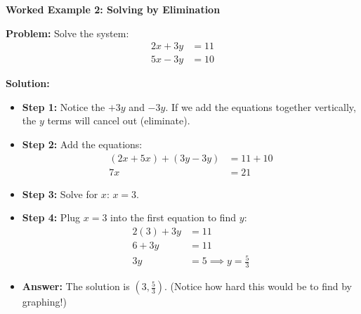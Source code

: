 \documentclass[12pt, letterpaper, fleqn]{article}
\begin{document}
\begin{tcolorbox}[colback=white, colframe=black!25, boxrule=0.6pt, arc=4mm, left=6mm, right=6mm, top=5mm, bottom=5mm]

\textbf{Worked Example 2: Solving by Elimination}

\medskip

\textbf{Problem:} Solve the system:
\begin{align*}
    2x + 3y &= 11 \\
    5x - 3y &= 10
\end{align*}

\medskip

\textbf{Solution:}
\begin{itemize}
    \item \textbf{Step 1:} Notice the $+3y$ and $-3y$. If we add the equations together vertically, the $y$ terms will cancel out (eliminate).
    \item \textbf{Step 2:} Add the equations:
    \begin{align*}
        (2x + 5x) + (3y - 3y) &= 11 + 10 \\
        7x &= 21
    \end{align*}
    \item \textbf{Step 3:} Solve for $x$: $x = 3$.
    \item \textbf{Step 4:} Plug $x=3$ into the first equation to find $y$:
    \begin{align*}
        2(3) + 3y &= 11 \\
        6 + 3y &= 11 \\
        3y &= 5 \implies y = \frac{5}{3}
    \end{align*}
    \item \textbf{Answer:} The solution is $(3, \frac{5}{3})$. (Notice how hard this would be to find by graphing!)
\end{itemize}

\end{tcolorbox}

\vspace{4mm}

\newpage
\end{document}
